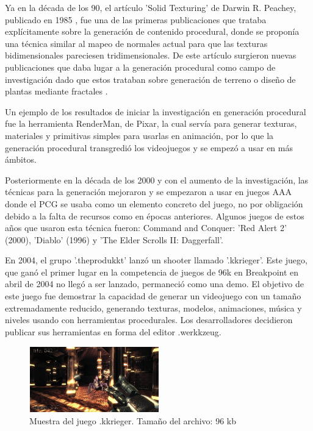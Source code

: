     Ya en la década de los 90, el artículo 'Solid Texturing' de Darwin R. Peachey, publicado en 1985 \cite{Peachey1985}, fue una de las primeras publicaciones que trataba explícitamente sobre la generación de contenido procedural, donde se proponía una técnica similar al mapeo de normales actual para que las texturas bidimensionales pareciesen tridimensionales. De este artículo surgieron nuevas publicaciones que daba lugar a la generación procedural como campo de investigación dado que estos trataban sobre generación de terreno \cite{LeeUrban2016} o diseño de plantas mediante fractales \cite{Oppenheimer1986}.
    
    Un ejemplo de los resultados de iniciar la investigación en generación procedural fue la herramienta RenderMan, de Pixar, la cual servía para generar texturas, materiales y primitivas simples para usarlas en animación, por lo que la generación procedural transgredió los videojuegos y se empezó a usar en más ámbitos.

    Posteriormente en la década de los 2000 y con el aumento de la investigación, las técnicas para la generación mejoraron y se empezaron a usar en juegos AAA donde el PCG se usaba como un elemento concreto del juego, no por obligación debido a la falta de recursos como en épocas anteriores. Algunos juegos de estos años que usaron esta técnica fueron: Command and Conquer: 'Red Alert 2' (2000), 'Diablo' (1996) y 'The Elder Scrolls II: Daggerfall'. \cite{ProceduralContentCreation}

    En 2004, el grupo '.theprodukkt' lanzó un shooter llamado '.kkrieger'. Este juego, que ganó el primer lugar en la competencia de juegos de 96k en Breakpoint en abril de 2004 no llegó a ser lanzado, permaneció como una demo. El objetivo de este juego fue demostrar la capacidad de generar un videojuego con un tamaño extremadamente reducido, generando texturas, modelos, animaciones, música y niveles usando con herramientas procedurales. Los desarrolladores decidieron publicar sus herramientas en forma del editor .werkkzeug. \cite{WikipediaKkrieger}
    
    \begin{figure}[h]
        \centering
        \includegraphics[width=0.5\textwidth]{img/.kkrieger.png}
        \caption{Muestra del juego .kkrieger. Tamaño del archivo: 96 kb}
    \end{figure}


